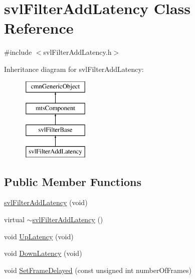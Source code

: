 \hypertarget{classsvl_filter_add_latency}{\section{svl\-Filter\-Add\-Latency Class Reference}
\label{classsvl_filter_add_latency}
}


{\ttfamily \#include $<$svl\-Filter\-Add\-Latency.\-h$>$}

Inheritance diagram for svl\-Filter\-Add\-Latency\-:\begin{figure}[H]
\begin{center}
\leavevmode
\includegraphics[height=4.000000cm]{d1/d9c/classsvl_filter_add_latency}
\end{center}
\end{figure}
\subsection*{Public Member Functions}
\begin{DoxyCompactItemize}
\item 
\hyperlink{classsvl_filter_add_latency_a8a35f064afd54f5e79a83e7325991f47}{svl\-Filter\-Add\-Latency} (void)
\item 
virtual \hyperlink{classsvl_filter_add_latency_a00b6253e53e92f5904374de49de3d6f2}{$\sim$svl\-Filter\-Add\-Latency} ()
\item 
void \hyperlink{classsvl_filter_add_latency_a5762a25ca96b3348737b826c9bacfd84}{Up\-Latency} (void)
\item 
void \hyperlink{classsvl_filter_add_latency_a37f482dc4b5cb281143f035ac0ee7015}{Down\-Latency} (void)
\item 
void \hyperlink{classsvl_filter_add_latency_ae6279a563cfb972897ac1c1798a95183}{Set\-Frame\-Delayed} (const unsigned int number\-Of\-Frames)
\end{DoxyCompactItemize}
